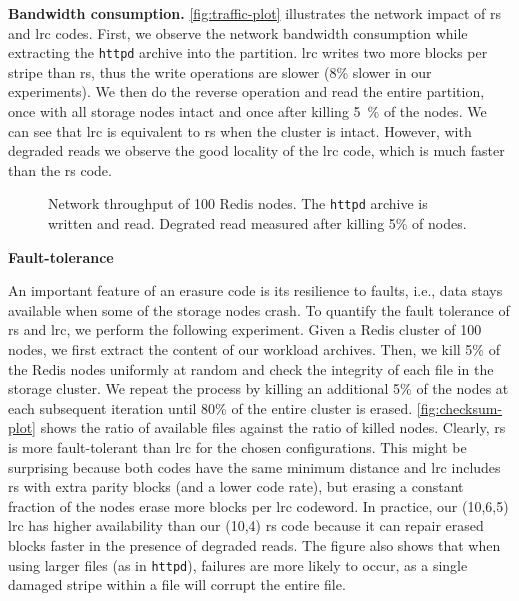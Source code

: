 \textbf{Bandwidth consumption.}
\label{subsec:network-traffic}
\autoref{fig:traffic-plot} illustrates the network impact of \ac{rs} and \ac{lrc} codes. 
First, we observe the network bandwidth consumption while extracting the \texttt{httpd} archive into the \SYS partition. 
\ac{lrc} writes two more blocks per stripe than \ac{rs}, thus the write operations are slower (8\% slower in our experiments). %
We then do the reverse operation and read the entire partition, once with all storage nodes intact and once after killing \SI{5}{\percent} of the nodes. 
We can see that \ac{lrc} is equivalent to \ac{rs} when the cluster is intact. 
However, with degraded reads we observe the good locality of the \ac{lrc} code, which is much faster than the \ac{rs} code. 

\begin{figure*}
    \centering
    
    \caption{Network throughput of 100 Redis nodes. The \texttt{httpd} archive is written and read. Degrated read measured after killing 5\% of nodes.}
    \label{fig:traffic-plot}
\end{figure*}

\textbf{Fault-tolerance}
\label{subsec:fault-tolerance}

An important feature of an erasure code is its resilience to faults, i.e., data stays available when some of the storage nodes crash. To quantify the fault tolerance of \ac{rs} and \ac{lrc}, we perform the following experiment. Given a Redis cluster of 100 nodes, we first extract the content of our workload archives. %
Then, we kill 5\% of the Redis nodes uniformly at random and check the integrity of each file in the storage cluster. We repeat the process by killing an additional 5\% of the nodes at each subsequent iteration until 80\% of the entire cluster is erased.
\autoref{fig:checksum-plot} shows the ratio of available files against the ratio of killed nodes.
Clearly, \ac{rs} is more fault-tolerant than \ac{lrc} for the chosen configurations. This might be surprising because both codes have the same minimum distance and \ac{lrc} includes \ac{rs} with extra parity blocks (and a lower code rate), but erasing a constant fraction of the nodes erase more blocks per \ac{lrc} codeword. In practice, our (10,6,5) \ac{lrc} has higher availability than our (10,4) \ac{rs} code because it can repair erased blocks faster in the presence of degraded reads.  The figure also shows that when using larger files (as in \texttt{httpd}), failures are more likely to occur, as a single damaged stripe within a file will corrupt the entire file.

